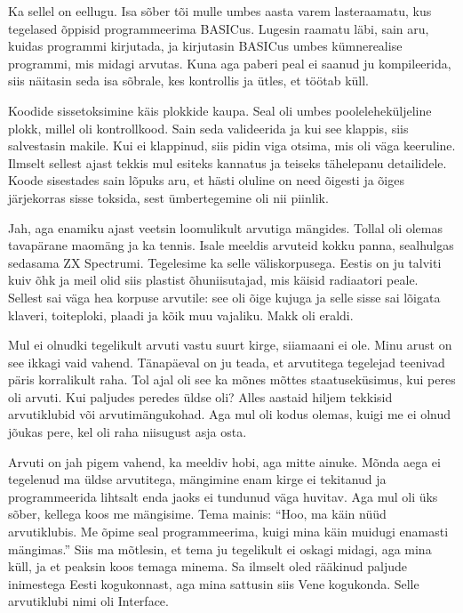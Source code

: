 
Ka sellel on eellugu. Isa sõber tõi mulle umbes aasta varem lasteraamatu, kus tegelased õppisid programmeerima 
BASICus. Lugesin raamatu läbi, sain aru, kuidas 
programmi kirjutada, ja kirjutasin BASICus umbes kümnerealise programmi, mis 
midagi arvutas. Kuna aga paberi peal ei saanud ju
kompileerida, siis näitasin seda isa sõbrale, kes kontrollis  
ja ütles, et töötab küll.

Koodide sissetoksimine käis plokkide kaupa. Seal oli 
umbes poole{\-}leheküljeline plokk, millel oli kontrollkood. Sain seda 
valideerida ja kui see klappis, siis salvestasin makile. 
Kui ei klappinud, siis pidin viga otsima, mis oli väga 
keeruline. Ilmselt sellest ajast tekkis mul esiteks 
kannatus ja teiseks tähelepanu detailidele. Koode sisestades sain
lõpuks aru, et hästi oluline on need õigesti ja õiges 
järjekorras sisse toksida, sest ümbertegemine oli nii piinlik.



Jah, aga enamiku ajast veetsin loomulikult arvutiga mängides. Tollal 
oli olemas tavapärane maomäng ja ka tennis. Isale meeldis arvuteid kokku panna, sealhulgas sedasama 
ZX Spectrumi. Tegelesime ka 
selle väliskorpusega. Eestis on ju talviti kuiv õhk ja 
meil olid siis plastist õhuniisutajad, mis käisid radiaatori peale. Sellest sai väga 
hea korpuse arvutile: see oli õige kujuga ja selle sisse sai lõigata 
klaveri, toiteploki, plaadi ja kõik muu vajaliku. Makk oli eraldi.


Mul ei olnudki tegelikult arvuti vastu suurt kirge, siiamaani ei ole. Minu arust on see ikkagi vaid vahend. Tänapäeval on ju
teada, et arvutitega tegelejad teenivad päris korralikult raha. Tol ajal oli see ka mõnes mõttes staatuseküsimus, kui peres oli
arvuti. Kui paljudes peredes
üldse oli? Alles aastaid hiljem tekkisid arvutiklubid või
arvutimängukohad. Aga mul oli kodus olemas, kuigi me ei olnud
jõukas pere, kel oli raha niisugust asja osta. 

Arvuti on jah pigem vahend, ka meeldiv hobi, aga mitte ainuke. Mõnda aega ei tegelenud ma üldse arvutitega, 
mängimine enam kirge ei tekitanud ja programmeerida lihtsalt enda jaoks ei
tundunud väga huvitav. Aga mul oli üks sõber, kellega koos me mängisime. Tema
mainis: \enquote{Hoo, ma käin nüüd arvutiklubis. Me õpime seal programmeerima,
kuigi mina käin muidugi enamasti mängimas.} Siis ma mõtlesin, et tema ju
tegelikult ei oskagi midagi, aga mina küll, ja et peaksin koos temaga minema. Sa
ilmselt oled rääkinud paljude inimestega Eesti kogukonnast, aga mina sattusin
siis Vene kogukonda. Selle arvutiklubi nimi oli Interface.

